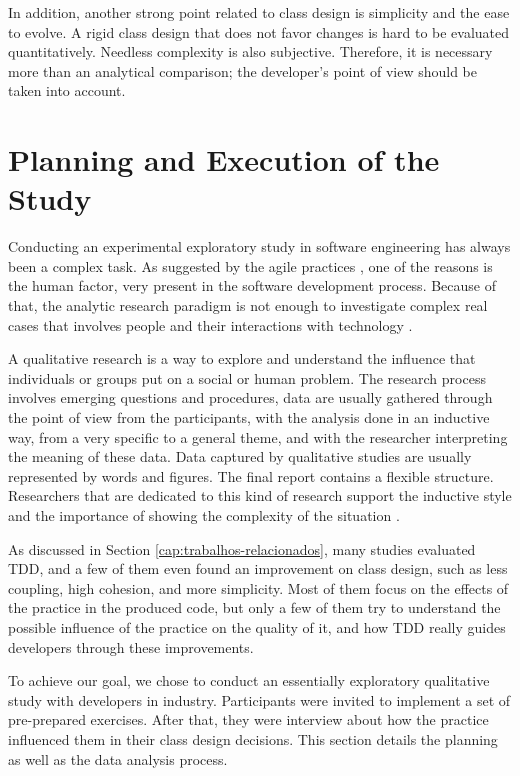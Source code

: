 \documentclass[conference]{IEEEtran}
\begin{document}
In addition, another strong point related to class design is simplicity and
the ease to evolve. A rigid class design that does not favor changes is hard
to be evaluated quantitatively. Needless complexity is also subjective.
Therefore, it is necessary more than an analytical comparison; the
developer's point of view should be taken into account.

\section{Planning and Execution of the Study} 
\label{sec:planejamento}

Conducting an experimental exploratory study in software engineering has always
been a complex task. As suggested by the agile practices \cite{AgileManifesto}, 
one of the reasons is the human factor, very present in 
the software development process. Because of that, the analytic research
paradigm is not enough to investigate complex real cases that involves people
and their interactions with technology \cite{guidelines-case-study}.

A qualitative research is a way to explore and understand the influence that
individuals or groups put on a social or human problem. The research process
involves emerging questions and procedures, data are usually gathered through
the point of view from the participants, with the analysis done in an inductive
way, from a very specific to a general theme, and with the researcher interpreting
the meaning of these data. Data captured by qualitative studies are usually
represented by words and figures. The final report contains a flexible structure.
Researchers that are dedicated to this kind of research support the inductive style and
the importance of showing the complexity of the situation \cite{creswell}.

As discussed in Section \ref{cap:trabalhos-relacionados}, many studies evaluated
TDD, and a few of them even found an improvement on class design, such as
less coupling, high cohesion, and more simplicity. Most of them focus on
the effects of the practice in the produced code, but only a few of them try to understand
the possible influence of the practice on the quality of it, and how TDD really guides
developers through these improvements.

To achieve our goal, we chose to conduct an essentially 
exploratory qualitative study with developers in industry. Participants
were invited to implement a set of pre-prepared exercises. After that,
they were interview about how the practice influenced them in their
class design decisions. This section details the planning as well as
the data analysis process.
\end{document}
